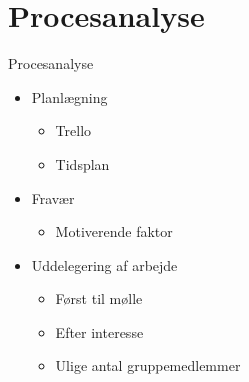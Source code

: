 
\section{Procesanalyse}
\begin{frame}{Procesanalyse}{}
	\begin{itemize}
		\item Planlægning
        \begin{itemize}
            \item Trello
            \item Tidsplan
        \end{itemize}
    \item Fravær
        \begin{itemize}
            \item Motiverende faktor
        \end{itemize}
		\item Uddelegering af arbejde
        \begin{itemize}
            \item Først til mølle
            \item Efter interesse
            \item Ulige antal gruppemedlemmer
        \end{itemize}
	\end{itemize}
  
\end{frame}



